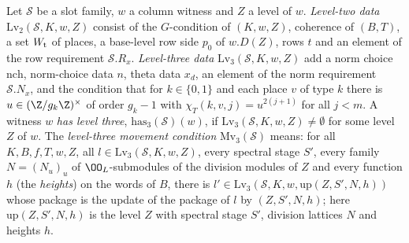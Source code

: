 \begin{definition}\label{pf:baselat2:lv3def}
Let $\mathcal S$ be a slot family, $w$ a column witness and $Z$ a level of $w$. \emph{Level-two data}
$\mathrm{Lv}_2(\mathcal S,K,w,Z)$ consist of the $G$-condition of $(K,w,Z)$, coherence of $(B,T)$, a set
$W_{\mathrm{t}}$ of places, a base-level row side $p_0$ of $w.D(Z)$, rows $t$ and an element of the row
requirement $\mathcal S.R_x$. \emph{Level-three data} $\mathrm{Lv}_3(\mathcal S,K,w,Z)$ add a norm choice
$\mathrm{nch}$, norm-choice data $n$, theta data $x_d$, an element of the norm requirement $\mathcal S.N_x$,
and the condition that for $k\in\{0,1\}$ and each place $v$ of type $k$ there is $u\in(\Z/g_k\Z)^\times$ of
order $g_k-1$ with $\chi_T(k,v,j)=u^{2(j+1)}$ for all $j<m$. A witness $w$ \emph{has level three},
$\mathrm{has}_3(\mathcal S)(w)$, if $\mathrm{Lv}_3(\mathcal S,K,w,Z)\ne\emptyset$ for some level $Z$ of $w$.
The \emph{level-three movement condition} $\mathrm{Mv}_3(\mathcal S)$ means: for all $K,B,f,T,w,Z$, all
$l\in\mathrm{Lv}_3(\mathcal S,K,w,Z)$, every spectral stage $S'$, every family $N=(N_u)_u$ of
$\OO_L$-submodules of the division modules of $Z$ and every function $h$ (the \emph{heights}) on the words
of $B$, there is $l'\in\mathrm{Lv}_3(\mathcal S,K,w,\mathrm{up}(Z,S',N,h))$ whose package is the update of the
package of $l$ by $(Z,S',N,h)$; here $\mathrm{up}(Z,S',N,h)$ is the level $Z$ with spectral stage $S'$,
division lattices $N$ and heights $h$.
\end{definition}

